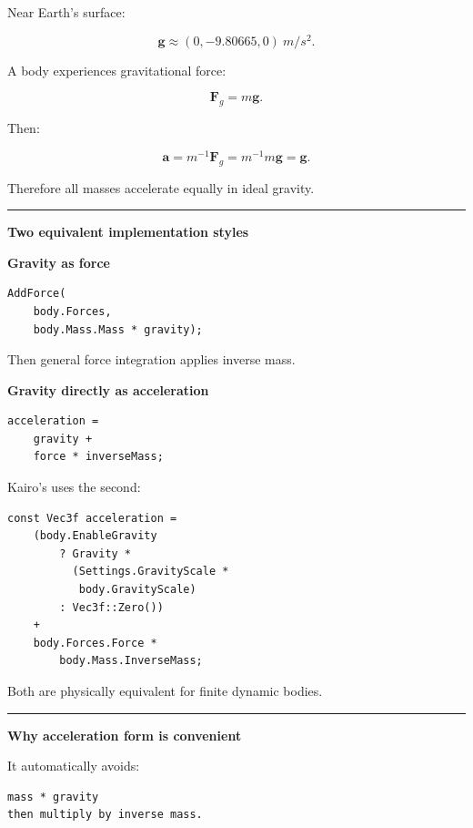 Near Earth's surface:

\[
\mathbf{g}
\approx
(0,-9.80665,0)
\ m/s^2.
\]

A body experiences gravitational force:

\[
\boxed{
\mathbf{F}_g
=
m\mathbf{g}.
}
\]

Then:

\[
\mathbf{a}
=
m^{-1}\mathbf{F}_g
=
m^{-1}m\mathbf{g}
=
\mathbf{g}.
\]

Therefore all masses accelerate equally in ideal gravity.

\begin{center}\rule{0.5\linewidth}{0.5pt}\end{center}

\textbf{Two equivalent implementation styles}

\textbf{Gravity as force}

\begin{verbatim}
AddForce(
    body.Forces,
    body.Mass.Mass * gravity);
\end{verbatim}

Then general force integration applies inverse mass.

\textbf{Gravity directly as acceleration}

\begin{verbatim}
acceleration =
    gravity +
    force * inverseMass;
\end{verbatim}

Kairo's  uses the second:

\begin{verbatim}
const Vec3f acceleration =
    (body.EnableGravity
        ? Gravity *
          (Settings.GravityScale *
           body.GravityScale)
        : Vec3f::Zero())
    +
    body.Forces.Force *
        body.Mass.InverseMass;
\end{verbatim}

Both are physically equivalent for finite dynamic bodies.

\begin{center}\rule{0.5\linewidth}{0.5pt}\end{center}

\textbf{Why acceleration form is convenient}

It automatically avoids:

\begin{verbatim}
mass * gravity
then multiply by inverse mass.
\end{verbatim}

